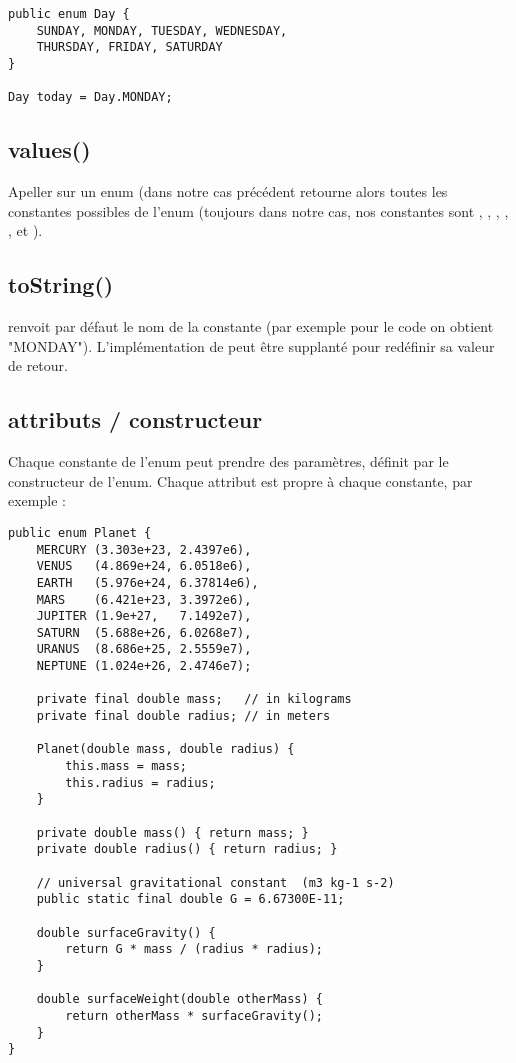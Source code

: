 \begin{verbatim}
public enum Day {
    SUNDAY, MONDAY, TUESDAY, WEDNESDAY,
    THURSDAY, FRIDAY, SATURDAY 
}

Day today = Day.MONDAY;
\end{verbatim}

\subsection{values()}

Apeller  sur un enum (dans notre cas précédent  retourne alors toutes les constantes possibles de l'enum (toujours dans notre cas, nos constantes sont , , , , ,  et ).

\subsection{toString()}

 renvoit par défaut le nom de la constante (par exemple pour le code  on obtient "MONDAY"). L'implémentation de  peut être supplanté pour redéfinir sa valeur de retour.

\subsection{attributs / constructeur}

Chaque constante de l'enum peut prendre des paramètres, définit par le constructeur de l'enum. Chaque attribut est propre à chaque constante, par exemple :

\begin{verbatim}
public enum Planet {
    MERCURY (3.303e+23, 2.4397e6),
    VENUS   (4.869e+24, 6.0518e6),
    EARTH   (5.976e+24, 6.37814e6),
    MARS    (6.421e+23, 3.3972e6),
    JUPITER (1.9e+27,   7.1492e7),
    SATURN  (5.688e+26, 6.0268e7),
    URANUS  (8.686e+25, 2.5559e7),
    NEPTUNE (1.024e+26, 2.4746e7);

    private final double mass;   // in kilograms
    private final double radius; // in meters
    
    Planet(double mass, double radius) {
        this.mass = mass;
        this.radius = radius;
    }
    
    private double mass() { return mass; }
    private double radius() { return radius; }

    // universal gravitational constant  (m3 kg-1 s-2)
    public static final double G = 6.67300E-11;

    double surfaceGravity() {
        return G * mass / (radius * radius);
    }
    
    double surfaceWeight(double otherMass) {
        return otherMass * surfaceGravity();
    }
}
\end{verbatim}

